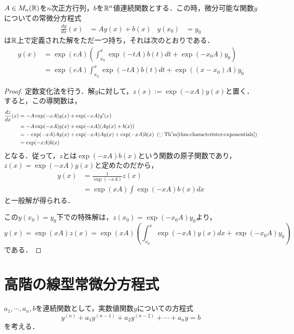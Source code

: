 \documentclass[uplatex,dvipdfmx]{jsreport}
\begin{document}
\begin{shadebox}\begin{theorem}[定数係数線型常微分方程式の解]
    $A\in M_n(\mathbb{R})$を$n$次正方行列，$b$を$\mathbb{R}^n$値連続関数とする．この時，微分可能な関数$y$についての常微分方程式
    \begin{align*}
        \frac{dy}{dx}(x)&=Ay(x)+b(x) & y(x_0)&= y_0
    \end{align*}
    は$\mathbb{R}$上で定義された解をただ一つ持ち，それは次のとおりである．
    \begin{align*}
        y(x) &= \exp(eA)\left(\int^x_{x_0}\exp(-tA)b(t)dt + \exp(-x_0A)y_0 \right)\\
        &= \exp(eA)\int^x_{x_0}\exp(-tA)b(t)dt + \exp((x-x_0)A)y_0 
    \end{align*}
\end{theorem}\end{shadebox}
\begin{proof}
    定数変化法を行う．解$y$に対して，$z(x):=\exp(-xA)y(x)$と置く．すると，この導関数は，
    \begin{align*}
        \frac{dz}{dx}(x) &= -A\exp(-xA)y(x) + \exp(-xA)y'(x)\\
        &= -A\exp(-xA)y(x) + \exp(-xA)(Ay(x)+b(x))\\
        &= -\exp(-xA)Ay(x) + \exp(-xA)Ay(x) + \exp(-xA)b(x)\;\;(\because \mathrm{Th'm}\ref{thm-characteristcs-exponentials})\\
        &= \exp(-xA)b(x)
    \end{align*}
    となる．従って，$z$とは$\exp(-xA)b(x)$という関数の原子関数であり，$z(x)=\exp(-xA)y(x)$と定めたのだから，
    \begin{align*}
        y(x) &= \frac{1}{\exp(-xA)}z(x)\\
        &= \exp(xA)\int\exp(-xA)b(x)dx
    \end{align*}
    と一般解が得られる．

    この$y(x_0)=y_0$下での特殊解は，$z(x_0)=\exp(-x_0A)y_0$より，
    \[ y(x)=\exp(xA)z(x)=\exp(xA)\left(\int^x_{x_0}\exp(-xA)y(x)dx + \exp(-x_0A)y_0\right) \]
    である．
\end{proof}

\section{高階の線型常微分方程式}
$a_1,\cdots,a_n,b$を連続関数として，実数値関数$y$についての方程式
\begin{equation}\label{equation-higher-order-linear-OED-1}
    y^{(n)}+a_1y^{(n-1)}+a_2y^{(n-2)}+\cdots+a_ny=b
\end{equation} 
を考える．
\end{document}
